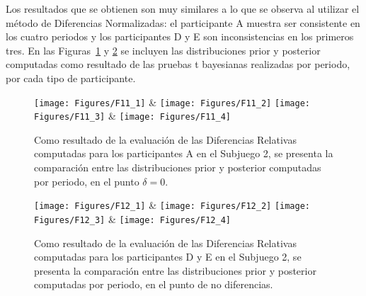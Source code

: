  Los resultados que se obtienen son muy similares a lo que se observa al utilizar el método de Diferencias Normalizadas: el participante A muestra ser consistente en los cuatro periodos y los participantes D y E son inconsistencias en los primeros tres. En las Figuras~\ref{fig:DR_S2_A} y \ref{fig:DR_S2_DyE} se incluyen las distribuciones prior y posterior computadas como resultado de las pruebas t bayesianas realizadas por periodo, por cada tipo de participante.\\

\begin{figure}[h]
\centering
\texttt{[image: Figures/F11\_1]} & \texttt{[image: Figures/F11\_2]} 
\texttt{[image: Figures/F11\_3]} & \texttt{[image: Figures/F11\_4]} 
\decoRule
\caption[Evaluación de las Diferencias Relativas entre creencias y elecciones en los participantes A en el Subjuego 2 (Factor de Bayes)]{Como resultado de la evaluación de las Diferencias Relativas computadas para los participantes A en el Subjuego 2, se presenta la comparación entre las distribuciones prior y posterior computadas por periodo, en el punto $\delta = 0$.}
\label{fig:DR_S2_A}
\end{figure}  


\begin{figure}[h]
\centering
\texttt{[image: Figures/F12\_1]} & \texttt{[image: Figures/F12\_2]} 
\texttt{[image: Figures/F12\_3]} & \texttt{[image: Figures/F12\_4]} 
\decoRule
\caption[Evaluación de las Diferencias Relativas entre creencias y elecciones en los participantes D y E en el Subjuego 2 (Factor de Bayes)]{Como resultado de la evaluación de las Diferencias Relativas computadas para los participantes D y E en el Subjuego 2, se presenta la comparación entre las distribuciones prior y posterior computadas por periodo, en el punto de no diferencias.}
\label{fig:DR_S2_DyE}
\end{figure}  


